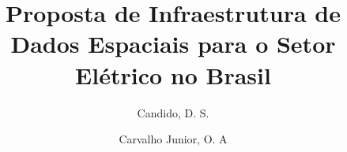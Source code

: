 \documentclass[preprint,authoryear,12pt]{elsarticle}
\begin{document}
\begin{frontmatter}



\title{Proposta de Infraestrutura de Dados Espaciais para o Setor El\'etrico no Brasil}

\author{Candido, D. S.}

\author{Carvalho Junior, O. A}

\address{Universidade de Bras\'{\i}lia, Instituto de Ci\^encias Humanas, Departamento de Geografia, Bras\'{\i}lia, DF - Brasil}




\begin{abstract}

\end{abstract}

\begin{keyword}


\end{keyword}

\end{frontmatter}
\end{document}
